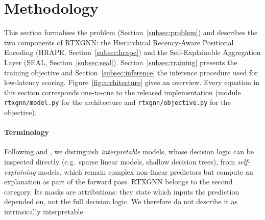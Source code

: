 \section{Methodology}
\label{sec:methodology}

This section formalises the problem (Section~\ref{subsec:problem}) and describes the two components of RTXGNN: the Hierarchical Recency-Aware Positional Encoding (HRAPE, Section~\ref{subsec:hrape}) and the Self-Explainable Aggregation Layer (SEAL, Section~\ref{subsec:seal}). Section~\ref{subsec:training} presents the training objective and Section~\ref{subsec:inference} the inference procedure used for low-latency scoring. Figure~\ref{fig:architecture} gives an overview. Every equation in this section corresponds one-to-one to the released implementation (module \texttt{rtxgnn/model.py} for the architecture and \texttt{rtxgnn/objective.py} for the objective).

\paragraph{Terminology} Following \citet{rudin2019stop} and \citet{lipton2018mythos}, we distinguish \emph{interpretable} models, whose decision logic can be inspected directly (e.g.\ sparse linear models, shallow decision trees), from \emph{self-explaining} models, which remain complex non-linear predictors but compute an explanation as part of the forward pass. RTXGNN belongs to the second category. Its masks are attributions: they state which inputs the prediction depended on, not the full decision logic. We therefore do not describe it as intrinsically interpretable.

